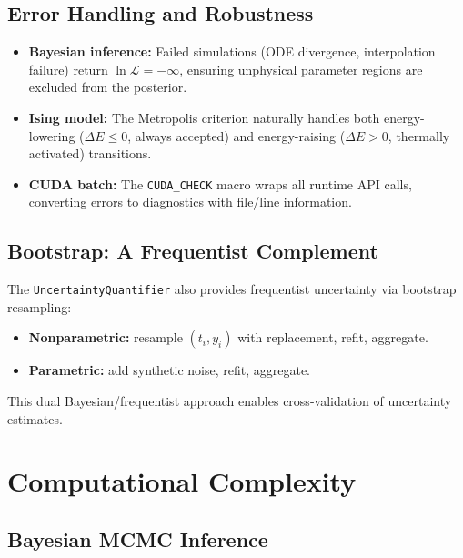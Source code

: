 \documentclass[11pt,letterpaper,twocolumn]{article}
\newcommand{\code}[1]{\texttt{#1}}
\theoremstyle{definition}
\begin{document}
\subsection{Error Handling and Robustness}

\begin{itemize}
  \item \textbf{Bayesian inference:} Failed simulations (ODE divergence, interpolation failure) return $\ln\mathcal{L} = -\infty$, ensuring unphysical parameter regions are excluded from the posterior.
  \item \textbf{Ising model:} The Metropolis criterion naturally handles both energy-lowering ($\Delta E \le 0$, always accepted) and energy-raising ($\Delta E > 0$, thermally activated) transitions.
  \item \textbf{CUDA batch:} The \code{CUDA\_CHECK} macro wraps all runtime API calls, converting errors to diagnostics with file/line information.
\end{itemize}

\subsection{Bootstrap: A Frequentist Complement}

The \code{UncertaintyQuantifier} also provides frequentist uncertainty via bootstrap resampling:

\begin{itemize}
  \item \textbf{Nonparametric:} resample $(t_i, y_i)$ with replacement, refit, aggregate.
  \item \textbf{Parametric:} add synthetic noise, refit, aggregate.
\end{itemize}

\noindent
This dual Bayesian/frequentist approach enables cross-validation of uncertainty estimates.

\section{Computational Complexity}\label{sec:complexity}

\subsection{Bayesian MCMC Inference}
\end{document}
